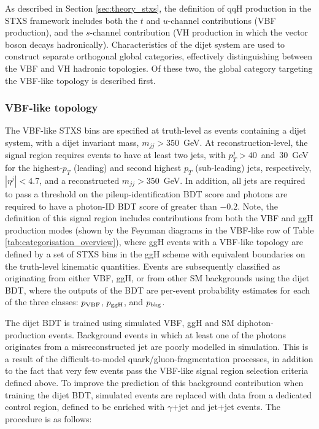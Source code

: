 As described in Section \ref{sec:theory_stxs}, the definition of qqH production in the STXS framework includes both the $t$ and $u$-channel contributions (VBF production), and the $s$-channel contribution (VH production in which the vector boson decays hadronically). Characteristics of the dijet system are used to construct separate orthogonal global categories, effectively distinguishing between the VBF and VH hadronic topologies. Of these two, the global category targeting the VBF-like topology is described first. 

\subsubsection{VBF-like topology}
The VBF-like STXS bins are specified at truth-level as events containing a dijet system, with a dijet invariant mass, $m_{jj}>350$~GeV. At reconstruction-level, the signal region requires events to have at least two jets, with $p_T^{j}>40$~and~$30$~GeV for the highest-$p_T$ (leading) and second highest $p_T$ (sub-leading) jets, respectively, $|\eta^j|<4.7$, and a reconstructed $m_{jj}>350$~GeV. In addition, all jets are required to pass a threshold on the pileup-identification BDT score and photons are required to have a photon-ID BDT score of greater than $-0.2$. Note, the definition of this signal region includes contributions from both the VBF and ggH production modes (shown by the Feynman diagrams in the VBF-like row of Table \ref{tab:categorisation_overview}), where ggH events with a VBF-like topology are defined by a set of STXS bins in the ggH scheme with equivalent boundaries on the truth-level kinematic quantities. Events are subsequently classified as originating from either VBF, ggH, or from other SM backgrounds using the dijet BDT, where the outputs of the BDT are per-event probability estimates for each of the three classes: $p_{\rm{VBF}}$, $p_{\rm{ggH}}$, and $p_{\rm{bkg}}$.

The dijet BDT is trained using simulated VBF, ggH and SM diphoton-production events. Background events in which at least one of the photons originates from a misreconstructed jet are poorly modelled in simulation. This is a result of the difficult-to-model quark/gluon-fragmentation processes, in addition to the fact that very few events pass the VBF-like signal region selection criteria defined above. To improve the prediction of this background contribution when training the dijet BDT, simulated events are replaced with data from a dedicated control region, defined to be enriched with $\gamma$+jet and jet+jet events. The procedure is as follows:


